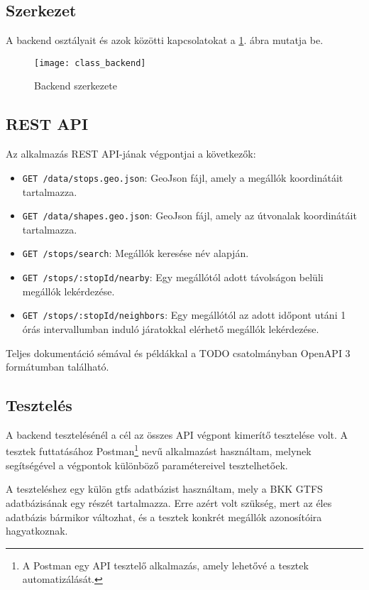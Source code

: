 \subsection{Szerkezet}

A backend osztályait és azok közötti kapcsolatokat a \ref{fig:backend-structure}. ábra mutatja be.

\begin{figure}[H]
    \centering
    \texttt{[image: class\_backend]}
    \caption{Backend szerkezete}
    \label{fig:backend-structure}
\end{figure}

\subsection{REST API}

Az alkalmazás REST API-jának végpontjai a következők:

\begin{itemize}
    \item \texttt{GET /data/stops.geo.json}: GeoJson fájl, amely a megállók koordinátáit tartalmazza.
    \item \texttt{GET /data/shapes.geo.json}: GeoJson fájl, amely az útvonalak koordinátáit tartalmazza.
    \item \texttt{GET /stops/search}: Megállók keresése név alapján.
    \item \texttt{GET /stops/:stopId/nearby}: Egy megállótól adott távolságon belüli megállók lekérdezése.
    \item \texttt{GET /stops/:stopId/neighbors}: Egy megállótól az adott időpont utáni 1 órás intervallumban induló járatokkal elérhető megállók lekérdezése.
\end{itemize}

Teljes dokumentáció sémával és példákkal a TODO csatolmányban OpenAPI 3 formátumban található.

\subsection{Tesztelés}

A backend tesztelésénél a cél az összes API végpont kimerítő tesztelése volt. A tesztek futtatásához Postman\footnote{A Postman egy API tesztelő alkalmazás, amely lehetővé a tesztek automatizálását.} nevű alkalmazást használtam, melynek segítségével a végpontok különböző paramétereivel tesztelhetőek.

A teszteléshez egy külön gtfs adatbázist használtam, mely a BKK GTFS adatbázisának egy részét tartalmazza. Erre azért volt szükség, mert az éles adatbázis bármikor változhat, és a tesztek konkrét megállók azonosítóira hagyatkoznak.

